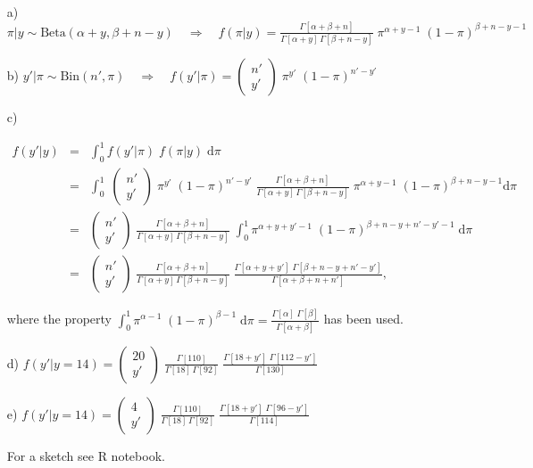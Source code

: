 \documentclass[fontsize=11pt,DIV=18,parskip=half]{scrartcl}
\begin{document}
\begin{enumerate}
\item[a)] $\displaystyle{\pi|y \sim \text{Beta}(\alpha+y, \beta+n-y) \quad \Rightarrow \quad f(\pi|y) = \frac{\Gamma[\alpha+\beta+n]}{\Gamma[\alpha+y] \, \Gamma[\beta+n-y]} \; \pi^{\alpha+y-1} \; (1-\pi)^{\beta+n-y-1}}$
\item[b)] $\displaystyle{y'|\pi \sim \text{Bin}(n',\pi) \quad \Rightarrow \quad f(y'|\pi) = \begin{pmatrix} n' \\ y' \end{pmatrix} \; \pi^{y'} \; (1-\pi)^{n'-y'}}$
\item[c)] 

\begin{eqnarray*}
f(y'|y) &=& \int_0^1 f(y'|\pi) \; f(\pi|y) \; \text{d}\pi \\
&=& \int_0^1 \; \begin{pmatrix} n' \\ y' \end{pmatrix} \; \pi^{y'} \; (1-\pi)^{n'-y'} \; \frac{\Gamma[\alpha+\beta+n]}{\Gamma[\alpha+y] \, \Gamma[\beta+n-y]} \; \pi^{\alpha+y-1} \; (1-\pi)^{\beta+n-y-1} \text{d}\pi \\
&=& \begin{pmatrix} n' \\ y' \end{pmatrix} \; \frac{\Gamma[\alpha+\beta+n]}{\Gamma[\alpha+y] \, \Gamma[\beta+n-y]} \; \int_0^1 \pi^{\alpha+y+y'-1} \; (1-\pi)^{\beta+n-y+n'-y'-1} \;  \text{d}\pi \\
&=& \begin{pmatrix} n' \\ y' \end{pmatrix} \; \frac{\Gamma[\alpha+\beta+n]}{\Gamma[\alpha+y] \, \Gamma[\beta+n-y]} \; \frac{\Gamma[\alpha+y+y']\;\Gamma[\beta+n-y+n'-y']}{\Gamma[\alpha+\beta+n+n']},
\end{eqnarray*}

where the property $\displaystyle{\int_0^1 \pi^{\alpha-1} \; (1-\pi)^{\beta-1}} \; \text{d}\pi = \frac{\Gamma[\alpha] \; \Gamma[\beta]}{\Gamma[\alpha+\beta]}$ has been used.
\item[d)] $\displaystyle{f(y'|y=14) = \begin{pmatrix} 20 \\ y' \end{pmatrix} \; \frac{\Gamma[110]}{\Gamma[18] \, \Gamma[92]} \; \frac{\Gamma[18+y']\;\Gamma[112-y']}{\Gamma[130]}}$
\item[e)] $\displaystyle{f(y'|y=14) = \begin{pmatrix} 4 \\ y' \end{pmatrix} \; \frac{\Gamma[110]}{\Gamma[18] \, \Gamma[92]} \; \frac{\Gamma[18+y']\;\Gamma[96-y']}{\Gamma[114]}}$

For a sketch see R notebook.
\end{enumerate}
\end{document}
